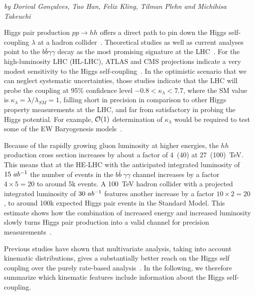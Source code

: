 \begin{center}
\textit{by Dorival Gon\c{c}alves, Tao Han, Felix Kling, Tilman Plehn and Michihisa Takeuchi}
\end{center}

\label{sec:THanetal}

Higgs pair production $pp\rightarrow hh$ offers a direct path to pin
down the Higgs self-coupling $\lambda$ at a hadron collider~\cite{Eboli:1987dy, Dicus:1987ic, Glover:183945, Plehn:1996wb, Djouadi:1999rca, Li:2013rra}.  
Theoretical studies as well as current analyses
point to the $b\bar{b}\gamma\gamma$ decay as the most promising
signature at the LHC~\cite{ATLAS-CONF-2016-004, Aad:2015xja}. 
For the high-luminosity LHC (HL-LHC),
ATLAS and CMS projections indicate a very modest sensitivity to the
Higgs self-coupling~\cite{ATL-PHYS-PUB-2017-001, CMS-PAS-FTR-16-002}. 
In the optimistic scenario that we can neglect systematic
uncertainties, those studies indicate that the LHC will probe the
coupling at 95\% confidence level $-0.8 < \kappa_\lambda < 7.7$, where the SM value is $\kappa_\lambda = \lambda/\lambda_{SM}=1$, 
falling short in precision in comparison to other Higgs 
property measurements at the LHC, and far from satisfactory in probing the
Higgs potential. For example, ${\cal O}(1)$ determination of $\kappa_\lambda$ would be required to 
test some of the EW Baryogenesis models~\cite{Kobakhidze:2015xlz, Chen:2017qcz, Gan:2017mcv, Cao:2017oez, Jain:2017sqm, deVries:2017ncy, Reichert:2017puo, Carena:2018vpt}.

Because of the rapidly growing gluon luminosity at higher energies,
the $hh$ production cross section increases by about a factor of
4~(40) at 27~(100)~TeV.  This means that at the HE-LHC with the
anticipated integrated luminosity of $15~ab^{-1}$ the number of events in
the $b\bar{b} \; \gamma \gamma$ channel increases by a factor $4
\times 5 = 20$ to around 5k events.  A 100~TeV hadron collider with
a projected integrated luminosity of $30~ab^{-1}$ features another
increase by a factor $10 \times 2=20$, to around 100k expected Higgs
pair events in the Standard Model.
This estimate shows how the combination of increased energy and
increased luminosity slowly turns Higgs pair production into a valid
channel for precision measurements~\cite{Goncalves:2018yva}. 

\label{sec:features}

Previous studies have shown that multivariate analysis, taking into 
account kinematic distributions, gives a substantially better reach 
on the Higgs self coupling over the purely rate-based 
analysis~\cite{Goncalves:2018yva,Kling:2016lay,Barger:2014qva,Bauer:2017cov}. In the following, we therefore 
summarize which kinematic features include information about the 
Higgs self-coupling. 


